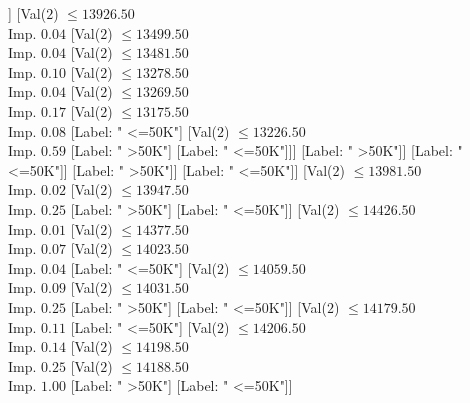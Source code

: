 \documentclass[margin=10pt]{standalone}
\begin{document}
\begin{forest}
																						[Label: " >50K"]]
																					[Val($2$) $ \leq 13926.50$ \\ Imp. $0.04$
																						[Val($2$) $ \leq 13499.50$ \\ Imp. $0.04$
																							[Val($2$) $ \leq 13481.50$ \\ Imp. $0.10$
																								[Val($2$) $ \leq 13278.50$ \\ Imp. $0.04$
																									[Val($2$) $ \leq 13269.50$ \\ Imp. $0.17$
																										[Val($2$) $ \leq 13175.50$ \\ Imp. $0.08$
																											[Label: " <=50K"]
																											[Val($2$) $ \leq 13226.50$ \\ Imp. $0.59$
																												[Label: " >50K"]
																												[Label: " <=50K"]]]
																										[Label: " >50K"]]
																									[Label: " <=50K"]]
																								[Label: " >50K"]]
																							[Label: " <=50K"]]
																						[Val($2$) $ \leq 13981.50$ \\ Imp. $0.02$
																							[Val($2$) $ \leq 13947.50$ \\ Imp. $0.25$
																								[Label: " >50K"]
																								[Label: " <=50K"]]
																							[Val($2$) $ \leq 14426.50$ \\ Imp. $0.01$
																								[Val($2$) $ \leq 14377.50$ \\ Imp. $0.07$
																									[Val($2$) $ \leq 14023.50$ \\ Imp. $0.04$
																										[Label: " <=50K"]
																										[Val($2$) $ \leq 14059.50$ \\ Imp. $0.09$
																											[Val($2$) $ \leq 14031.50$ \\ Imp. $0.25$
																												[Label: " >50K"]
																												[Label: " <=50K"]]
																											[Val($2$) $ \leq 14179.50$ \\ Imp. $0.11$
																												[Label: " <=50K"]
																												[Val($2$) $ \leq 14206.50$ \\ Imp. $0.14$
																													[Val($2$) $ \leq 14198.50$ \\ Imp. $0.25$
																														[Val($2$) $ \leq 14188.50$ \\ Imp. $1.00$
																															[Label: " >50K"]
																															[Label: " <=50K"]]

\end{forest}
\end{document}
